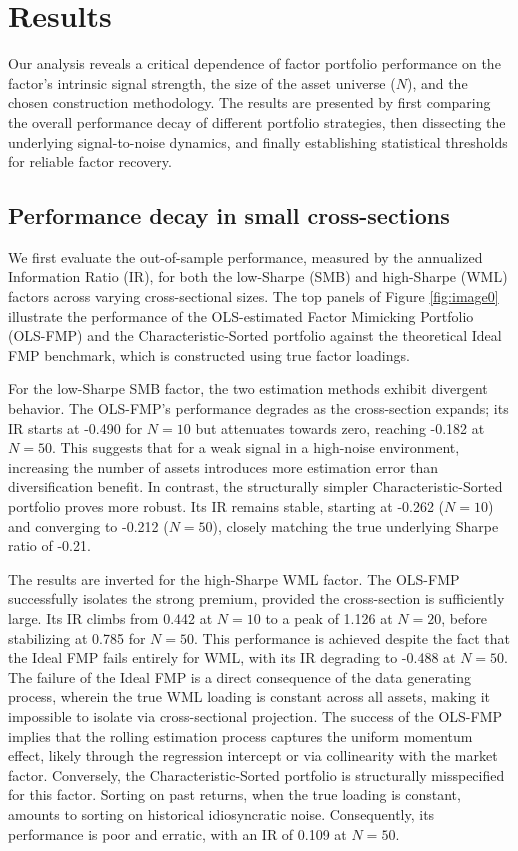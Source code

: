 \documentclass[]{article}
\begin{document}
\section{Results}
\label{sec:results}
Our analysis reveals a critical dependence of factor portfolio performance on the factor's intrinsic signal strength, the size of the asset universe ($N$), and the chosen construction methodology. The results are presented by first comparing the overall performance decay of different portfolio strategies, then dissecting the underlying signal-to-noise dynamics, and finally establishing statistical thresholds for reliable factor recovery.

\subsection{Performance decay in small cross-sections}

We first evaluate the out-of-sample performance, measured by the annualized Information Ratio (IR), for both the low-Sharpe (SMB) and high-Sharpe (WML) factors across varying cross-sectional sizes. The top panels of Figure \ref{fig:image0} illustrate the performance of the OLS-estimated Factor Mimicking Portfolio (OLS-FMP) and the Characteristic-Sorted portfolio against the theoretical Ideal FMP benchmark, which is constructed using true factor loadings.

For the low-Sharpe SMB factor, the two estimation methods exhibit divergent behavior. The OLS-FMP's performance degrades as the cross-section expands; its IR starts at -0.490 for $N=10$ but attenuates towards zero, reaching -0.182 at $N=50$. This suggests that for a weak signal in a high-noise environment, increasing the number of assets introduces more estimation error than diversification benefit. In contrast, the structurally simpler Characteristic-Sorted portfolio proves more robust. Its IR remains stable, starting at -0.262 ($N=10$) and converging to -0.212 ($N=50$), closely matching the true underlying Sharpe ratio of -0.21.

The results are inverted for the high-Sharpe WML factor. The OLS-FMP successfully isolates the strong premium, provided the cross-section is sufficiently large. Its IR climbs from 0.442 at $N=10$ to a peak of 1.126 at $N=20$, before stabilizing at 0.785 for $N=50$. This performance is achieved despite the fact that the Ideal FMP fails entirely for WML, with its IR degrading to -0.488 at $N=50$. The failure of the Ideal FMP is a direct consequence of the data generating process, wherein the true WML loading is constant across all assets, making it impossible to isolate via cross-sectional projection. The success of the OLS-FMP implies that the rolling estimation process captures the uniform momentum effect, likely through the regression intercept or via collinearity with the market factor. Conversely, the Characteristic-Sorted portfolio is structurally misspecified for this factor. Sorting on past returns, when the true loading is constant, amounts to sorting on historical idiosyncratic noise. Consequently, its performance is poor and erratic, with an IR of 0.109 at $N=50$.
\end{document}
